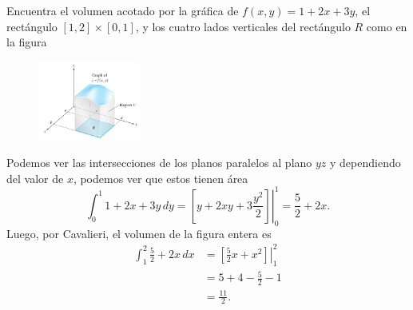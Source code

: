 Encuentra el volumen acotado por la gráfica de 
$f(x,y)=1+2x+3y$, el rectángulo 
$[1,2]\times [0,1]$, y los cuatro lados verticales del rectángulo 
$R$
como en la figura
\begin{figure}[H]
    \begin{center}
        \includegraphics[width=0.3\textwidth]{img/Ej2/ej14.png}
    \end{center}
\end{figure}
\begin{solution}
% 
    Podemos ver las intersecciones de los planos paralelos al plano \( yz \) y dependiendo 
    del valor de $x$, podemos ver que estos tienen
    área
    \[ \int_{0}^1 1+2x+3y \, dy = \left. \left[ y+2xy+3 \frac{y^2}{2} \right] \right\rvert_0^1 =
    \frac{5}{2} +2x.\] 
    Luego, por Cavalieri,  el volumen de la figura entera es 
    \begin{align*}
        \int_1^2
        \frac{5}{2} +2x \, dx
        &=
        \left.
        \left[ \frac{5}{2} x + x^2 \right] \right\rvert_1^2\\
        &=
        5+4- \frac{5}{2} - 1\\
        &=
        \frac{11}{2}.
    \end{align*}
\end{solution}
